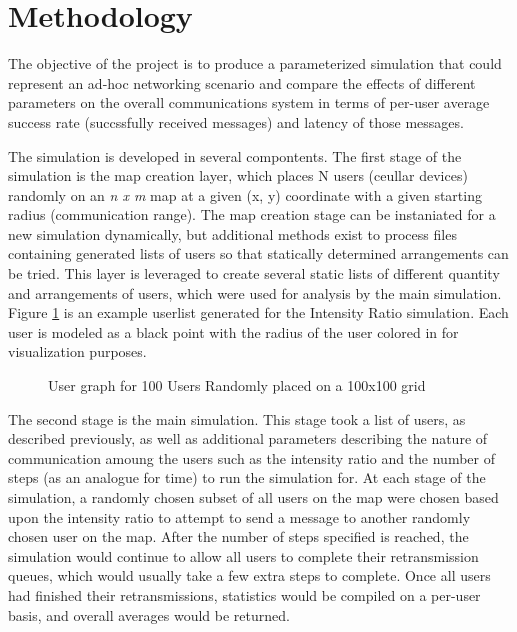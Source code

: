 \section{Methodology}
The objective of the project is to produce a parameterized simulation 
that could represent an ad-hoc networking scenario and compare the effects 
of different parameters on the overall communications system in terms of 
per-user average success rate (succssfully received messages) 
and latency of those messages.

The simulation is developed in several compontents.
The first stage of the simulation is the map creation layer,
which places N users (ceullar devices) randomly on an \textit{n x m} map at a
given (x, y) coordinate with a given starting radius (communication range).
The map creation stage can be instaniated for a new simulation dynamically, 
but additional methods exist to process files containing generated lists of 
users so that statically determined arrangements can be tried.
This layer is leveraged to create several static lists of different quantity
and arrangements of users, which were used for analysis by the main simulation.
Figure \ref{fig:usergraph} is an example userlist generated for the Intensity Ratio simulation.
Each user is modeled as a black point with the radius of the user colored in
for visualization purposes.
\par
\begin{figure}
    
    \caption{User graph for 100 Users Randomly placed on a 100x100 grid}
    \label{fig:usergraph}
\end{figure}
\par

The second stage is the main simulation.
This stage took a list of users, as described previously, as well as additional
parameters describing the nature of communication amoung the users such as
the intensity ratio and the number of steps (as an analogue for time) to run 
the simulation for.
At each stage of the simulation, a randomly chosen subset of all users on the map
were chosen based upon the intensity ratio to attempt to send a message to another
randomly chosen user on the map.
After the number of steps specified is reached, the simulation would continue
to allow all users to complete their retransmission queues, which would usually
take a few extra steps to complete.
Once all users had finished their retransmissions, statistics would be compiled
on a per-user basis, and overall averages would be returned.

